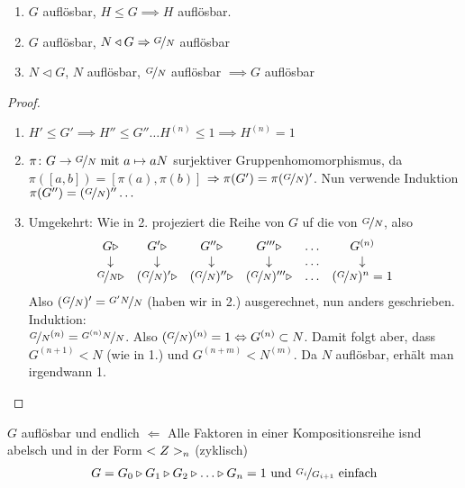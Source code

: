 \begin{proposition}[Klausur!!!]
	\begin{enumerate}
		\item $G$ auflösbar, $H \le G \implies H$ auflösbar.
		\item $G$ auflösbar, $N \lhd G \implies \lnkset{G}{N}$ auflösbar
		\item $N \lhd G$, $N$ auflösbar, $\lnkset{G}{N}$ auflösbar $\implies G$ auflösbar
	\end{enumerate}
\end{proposition}
\begin{proof}
	\begin{enumerate}
		\item $H' \le G' \implies H'' \le G'' \dots H^{(n)} \le 1 \implies H^{(n)} = 1$
		\item $\pi \colon G \to \lnkset{G}{N} \mit a \mapsto aN$ surjektiver Gruppenhomomorphismus, da $\pi([a,b]) = [\pi(a), \pi(b)]$ $\implies \pi(G') = \pi (\lnkset{G}{N})'$. Nun verwende Induktion $\pi(G'') = (\lnkset{G}{N})'' \dots$
		\item Umgekehrt: Wie in 2. projeziert die Reihe von $G$ uf die von $\lnkset{G}{N}$, also
		\begin{align*}
			\begin{matrix}
				G \rhd & G' \rhd & G'' \rhd & G''' \rhd & \dots & G^{(n)}\\
				\downarrow & \downarrow & \downarrow & \downarrow & \dots & \downarrow\\
				\lnkset{G}{N} \rhd & (\lnkset{G}{N})' \rhd & (\lnkset{G}{N})'' \rhd & (\lnkset{G}{N})''' \rhd & \dots & (\lnkset{G}{N})^{n} = 1
			\end{matrix}
		\end{align*}
		Also $(\lnkset{G}{N})' = \lnkset{G' N}{N}$ (haben wir in 2.) ausgerechnet, nun anders geschrieben. Induktion:\\
		$\lnkset{G}{N}^{(n)} = \lnkset{G^{(n)}N}{N}$. Also $(\lnkset{G}{N})^{(n)} = 1 \Leftrightarrow G^{(n)} \subset N$. Damit folgt aber, dass $G^{(n+1)} < N$ (wie in 1.) und $G^{(n+m)}< N^{(m)}$. Da $N$ auflösbar, erhält man irgendwann 1.
	\end{enumerate}
\end{proof}
\begin{proposition}
	$G$ auflösbar und endlich $\Leftarrow$ Alle Faktoren in einer Kompositionsreihe isnd abelsch und in der Form $<Z>_n$ (zyklisch)
	\begin{align*}
		G = G_0 \rhd G_1 \rhd G_2 \rhd \dots \rhd G_n = 1 \und \lnkset{G_i}{G_{i+1}} \text{ einfach}
	\end{align*}
\end{proposition}
